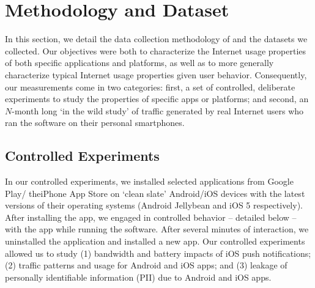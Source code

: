 \section{Methodology and Dataset}
\label{sec:Methodology}

In this section, we detail the data collection methodology of \platname and the datasets we collected.
Our objectives were both to characterize the Internet usage properties of both specific applications and platforms, as well as to more generally characterize typical Internet usage properties given user behavior.
Consequently, our measurements come in two categories: first, a set of controlled, deliberate experiments to study the properties of specific apps or platforms; and second, an $N$-month long `in the wild study' of traffic generated by real Internet users who ran the \platname software on their personal smartphones.

\subsection{Controlled Experiments}
  In our controlled experiments, we installed selected applications from Google Play/ theiPhone App Store on `clean slate' Android/iOS devices with the latest versions of their operating systems (Android Jellybean and iOS 5 respectively). 
  After installing the app, we engaged in controlled behavior -- detailed below -- with the app while running the \platname software. 
  After several minutes of interaction, we uninstalled the application and installed a new app.
  Our controlled experiments allowed us to study (1) bandwidth and battery impacts of iOS push notifications; (2) traffic patterns and usage for Android and iOS apps; and (3) leakage of personally identifiable information (PII) due to Android and iOS apps.

